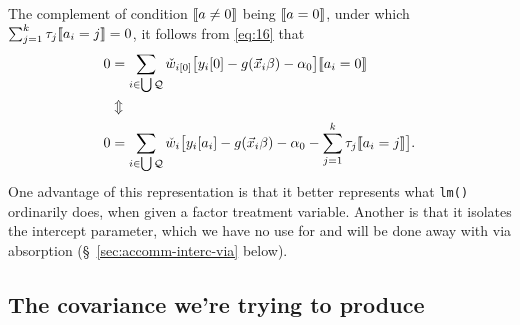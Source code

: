 \documentclass{article}
\DeclarePairedDelimiter{\indicator}{\llbracket}{\rrbracket}
\newcommand{\owt}[1][{[a_i]}]{\ensuremath{\check{w}_{i#1}}}
\begin{document}
The complement of condition $\indicator{a\neq 0}$ being
$\indicator{a=0}$, under which
$\sum_{j=1}^{k}\tau_{j}\indicator{a_{i}=j}=0$, it follows from \eqref{eq:16} that
\begin{align*}
         0 &= \sum_{i \in \bigcup \mathcal{Q}}\owt[{[0]}]\big[y_{i}[0] - g(\vec{x}_{i}\beta)-
                  \alpha_{0}\big]\indicator{a_{i}
             =0}\\
           & \Updownarrow \\
         0 &= \sum_{i \in \bigcup \mathcal{Q}}\owt[]\big[y_{i}[a_i] - g(\vec{x}_{i}\beta)-
                  \alpha_{0} - \sum_{j=1}^{k}\tau_{j}\indicator{a_{i}=j}\big].
\end{align*}
One advantage of this representation is that it better represents what
\texttt{lm()} ordinarily does, when given a factor treatment
variable.  Another is that it isolates the intercept parameter, which
we have no use for and will be done away with via absorption (\S~\ref{sec:accomm-interc-via} below). 

\subsection{The covariance we're trying to
  produce}\label{sec:covar-were-trying}
\end{document}
